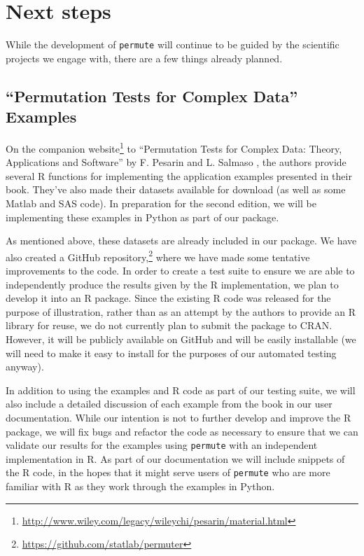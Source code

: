 \chapter{\label{ch:nextsteps}Next steps}

While the development of \texttt{permute} will continue to be guided by the
scientific projects we engage with, there are a few things already planned.

\section{\label{sec:book}``Permutation Tests for Complex Data'' Examples}

On the companion
website\footnote{\url{http://www.wiley.com/legacy/wileychi/pesarin/material.html}}
to ``Permutation Tests for Complex Data: Theory, Applications and
Software'' by F. Pesarin and L. Salmaso \cite{pesarin2010permutation}, the
authors provide several R functions for implementing the application examples
presented in their book.  They've also made their datasets available for download
(as well as some Matlab and SAS code).  In preparation for the second edition,
we will be implementing these examples in Python as part of our package.

As mentioned above, these datasets are already included in our package.  We have
also created a GitHub
repository,\footnote{\url{https://github.com/statlab/permuter}} where we have
made some tentative improvements to the code.  In order to create a test suite
to ensure we are able to independently produce the results given by the R
implementation, we plan to develop it into an R package.  Since the existing R
code was released for the purpose of illustration, rather than as an attempt by
the authors to provide an R library for reuse, we do not currently plan to
submit the package to CRAN.  However, it will be publicly available on GitHub
and will be easily installable (we will need to make it easy to install for the
purposes of our automated testing anyway).

In addition to using the examples and R code as part of our testing suite, we
will also include a detailed discussion of each example from the book in our
user documentation.  While our intention is not to further develop and improve
the R package, we will fix bugs and refactor the code as necessary to ensure
that we can validate our results for the examples using \texttt{permute} with
an independent implementation in R.  As part of our documentation we will
include snippets of the R code, in the hopes that it might serve users of
\texttt{permute} who are more familiar with R as they work through the examples
in Python.

